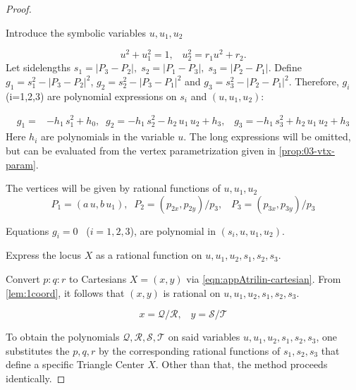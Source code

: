 \begin{proof}

		
\begin{step}

 
Introduce the symbolic variables $u, u_1, u_2$
 
\begin{equation*}
    u^2 + u_1^2 = 1,\;\;\;   u_2^2 = r_1u^2+r_2.
\end{equation*} %
Let sidelengths $s_1=|P_3-P_2|,\; s_2=|P_1-P_3|,\;s_3=|P_2-P_1|$. Define $g_1=s_1^2-|P_3-P_2|^2$, $g_2=s_2^2-|P_3-P_1|^2$
and $g_3=s_3^2-|P_2-P_1|^2$. 
Therefore, $g_i$(i=1,2,3)   are polynomial expressions on $s_i$ and $(u,u_1,u_2)$:


	\begin{align*}
		g_1=&    -h_1 \, s_1^2 
		+h_0,\;\;g_2=- h_1\, s_2^2 -
		h_2 \,u_1 \,u_2 +h_3,\;\;\;g_3=- h_1 \,s_3^2 + h_2\,  u_1\, u_2+h_3\end{align*}
Here $h_i$ are polynomials in the variable $u$.	The long expressions will be 
omitted, but can be evaluated from the vertex parametrization given in \cref{prop:03-vtx-param}.	
\end{step}
 
\noindent The vertices will be given by rational functions of   $u, u_1, u_2$ 
\begin{equation*} P_1 = (a\,u, b\,u_1),\;\;P_2 = (p_{2x}, p_{2y})/p_3,\;\;\;P_3 = (p_{3x}, p_{3y})/p_3 
\end{equation*}
 
Equations $g_i=0$ \, ($i=1,2,3$), are polynomial in $ (s_i,u,u_1,u_2)$.
 
\begin{step} Express the locus  $X$ as a  rational function on  $u,u_1, u_2, s_1, s_2, s_3$.
\end{step}

Convert $p:q:r$ to Cartesians $ X = (x,y)$ via  \cref{eqn:appAtrilin-cartesian}. From  \cref{lem:1coord}, it follows that
$\left(x,y\right)$ is rational on $u,u_1,u_2,s_1,s_2,s_3$.

\begin{equation*} x=\mathcal{Q}/\mathcal{R},\;\;\;y=\mathcal{S}/\mathcal{T}
\end{equation*}

\noindent To obtain the polynomials    $\mathcal{Q,R,S,T}$  on said variables $u,u_1,u_2,s_1,s_2,s_3$,
 one substitutes the 
$p,q,r$ by the corresponding rational functions of  $s_1, s_2, s_3$ that define a specific Triangle Center $X$. Other than that, the method proceeds identically.


\end{proof}

